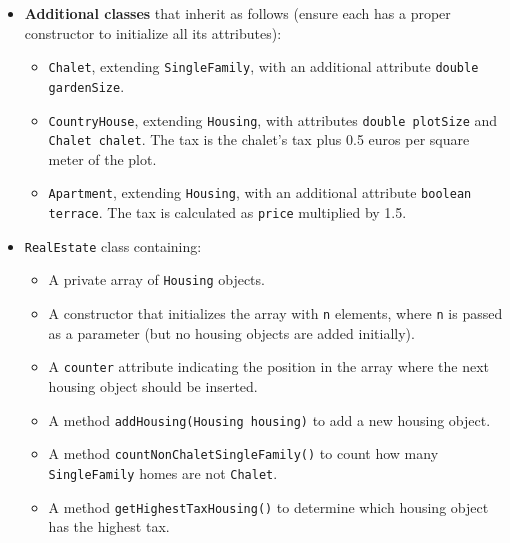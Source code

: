 \begin{itemize}
    \item \textbf{Additional classes} that inherit as follows (ensure each has a proper constructor to initialize all its attributes):

        \begin{itemize}

            \item \texttt{Chalet}, extending \texttt{SingleFamily}, with an additional attribute \texttt{double gardenSize}.

            \item \texttt{CountryHouse}, extending \texttt{Housing}, with attributes \texttt{double plotSize} and \texttt{Chalet chalet}. The tax is the chalet's tax plus 0.5 euros per square meter of the plot.

            \item \texttt{Apartment}, extending \texttt{Housing}, with an additional attribute \texttt{boolean terrace}. The tax is calculated as \texttt{price} multiplied by 1.5.

        \end{itemize}

    \item \texttt{RealEstate} class containing:

        \begin{itemize}

            \item A private array of \texttt{Housing} objects.

            \item A constructor that initializes the array with \texttt{n} elements, where \texttt{n} is passed as a parameter (but no housing objects are added initially).

            \item A \texttt{counter} attribute indicating the position in the array where the next housing object should be inserted.

            \item A method \texttt{addHousing(Housing housing)} to add a new housing object.

            \item A method \texttt{countNonChaletSingleFamily()} to count how many \texttt{SingleFamily} homes are not \texttt{Chalet}.

            \item A method \texttt{getHighestTaxHousing()} to determine which housing object has the highest tax.

        \end{itemize}

\end{itemize}

